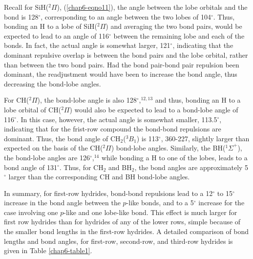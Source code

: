 Recall for SiH(${^2\Pi}$), (\ref{chap6-eqno11}), the angle between the lobe orbitals 
and the bond is 128$^{\circ}$, corresponding to an angle between the 
two lobes of 104$^{\circ}$.  Thus, bonding an H to a lobe of 
SiH(${^2\Pi}$) and averaging the two bond pairs, would be expected to 
lead to an angle of 116$^{\circ}$ between the remaining lobe and each 
of the bonds.  In fact, the actual angle is somewhat larger, 
121$^{\circ}$, indicating that the dominant repulsive overlap is 
between the bond pairs and the lobe orbital, rather than between the 
two bond pairs.  Had the bond pair-bond pair repulsion been dominant, 
the readjustment would have been to increase the bond angle, thus 
decreasing the bond-lobe angles.

For CH(${^2\Pi}$), the bond-lobe angle is also 
128$^{\circ}$,$^{12,13}$ and thus, bonding an H to a lobe orbital of 
CH(${^2\Pi}$) would also be expected to lead to a bond-lobe angle 
of 116$^{\circ}$.  In this case, however, the actual angle is somewhat 
smaller, 113.5$^{\circ}$, indicating that for the frist-row compound 
the bond-bond repulsions are dominant.  Thus, the bond angle of 
CH$_2$(${^3B}_1$) is 113$^{\circ}$, 360-227, slightly larger than 
expected on the basis of the CH(${^2\Pi}$) bond-lobe angles.  
Similarly, the BH(${^1\Sigma}^+$), the bond-lobe angles are 
126$^{\circ}$,$^{14}$ while bonding a H to one of the lobes, leads to 
a bond angle of 131$^{\circ}$.  Thus, for CH$_2$ and BH$_2$, the bond 
angles are approximately 5$^{\circ}$ larger than the corresponding CH 
and BH bond-lobe angles.

In summary, for first-row hydrides, bond-bond repulsions lead to a 
12$^{\circ}$ to 15$^{\circ}$ increase in the bond angle between the 
$p$-like bonds, and to a 5$^{\circ}$ increase for the case involving 
one $p$-like and one lobe-like bond.  This effect is much larger for 
first row hydrides than for hydrides of any of the lower rows, simple 
because of the smaller bond lengths in the first-row hydrides.  A 
detailed comparison of bond lengths and bond angles, for first-row, 
second-row, and third-row hydrides is given in Table \ref{chap6-table1}.


